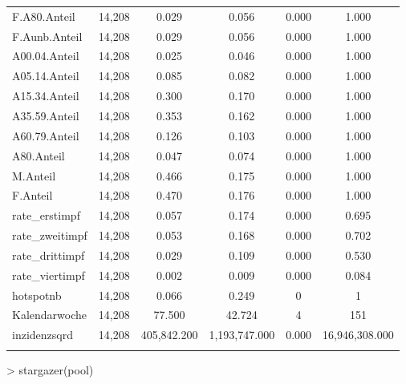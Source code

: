 \documentclass{article}
\begin{document}
\begin{table}[!htbp]
\begin{tabular}{@{\extracolsep{5pt}}lccccc}
F.A80.Anteil & 14,208 & 0.029 & 0.056 & 0.000 & 1.000 \\ 
F.Aunb.Anteil & 14,208 & 0.029 & 0.056 & 0.000 & 1.000 \\ 
A00.04.Anteil & 14,208 & 0.025 & 0.046 & 0.000 & 1.000 \\ 
A05.14.Anteil & 14,208 & 0.085 & 0.082 & 0.000 & 1.000 \\ 
A15.34.Anteil & 14,208 & 0.300 & 0.170 & 0.000 & 1.000 \\ 
A35.59.Anteil & 14,208 & 0.353 & 0.162 & 0.000 & 1.000 \\ 
A60.79.Anteil & 14,208 & 0.126 & 0.103 & 0.000 & 1.000 \\ 
A80.Anteil & 14,208 & 0.047 & 0.074 & 0.000 & 1.000 \\ 
M.Anteil & 14,208 & 0.466 & 0.175 & 0.000 & 1.000 \\ 
F.Anteil & 14,208 & 0.470 & 0.176 & 0.000 & 1.000 \\ 
rate\_erstimpf & 14,208 & 0.057 & 0.174 & 0.000 & 0.695 \\ 
rate\_zweitimpf & 14,208 & 0.053 & 0.168 & 0.000 & 0.702 \\ 
rate\_drittimpf & 14,208 & 0.029 & 0.109 & 0.000 & 0.530 \\ 
rate\_viertimpf & 14,208 & 0.002 & 0.009 & 0.000 & 0.084 \\ 
hotspotnb & 14,208 & 0.066 & 0.249 & 0 & 1 \\ 
Kalendarwoche & 14,208 & 77.500 & 42.724 & 4 & 151 \\ 
inzidenzsqrd & 14,208 & 405,842.200 & 1,193,747.000 & 0.000 & 16,946,308.000 \\ 
\hline \\[-1.8ex] 
\end{tabular} 
\end{table} 
> stargazer(pool)
\end{document}
